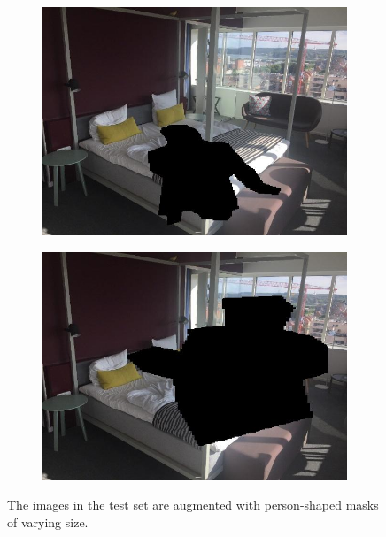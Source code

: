 \begin{figure}
    \centering
    \begin{subfigure}[b]{.49\columnwidth}
        \centering
        \includegraphics[width=.95\columnwidth]{figures/chapter4/example_masks/1.jpg}
    \end{subfigure}
    \begin{subfigure}[b]{.49\columnwidth}
        \centering
        \includegraphics[width=.95\columnwidth]{figures/chapter4/example_masks/3.jpg}
    \end{subfigure}
    \caption{The images in the test set are augmented with person-shaped masks of varying size.}
    \label{fig:example_masks}
\end{figure}

